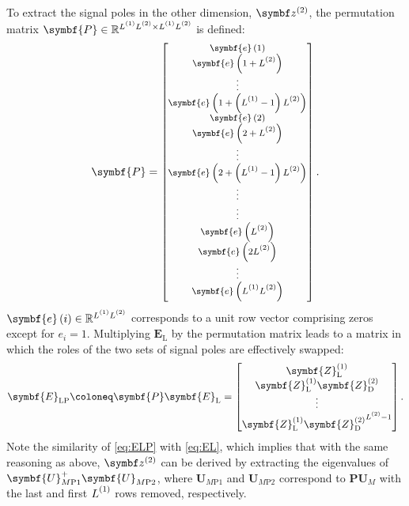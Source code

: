 To extract the signal poles in the other dimension, $\bdztwo$, the permutation
matrix $\symbf{P} \in \mathbb{R}^{\Lone \Ltwo \times \Lone \Ltwo}$ is defined:
\begin{equation}
    \symbf{P} =
    {\footnotesize
    \begin{bmatrix}
        \symbf{e}\left(1\right) \\
        \symbf{e}\left(1 + \Ltwo\right) \\
        \vdots \\
        \symbf{e}\left(1 + \left(\Lone - 1\right)\Ltwo\right) \\
        \symbf{e}\left(2\right) \\
        \symbf{e}\left(2 + \Ltwo\right) \\
        \vdots \\
        \symbf{e}\left(2 + \left(\Lone - 1\right)\Ltwo\right) \\
        \vdots \\
        \vdots \\
        \symbf{e}\left(\Ltwo\right) \\
        \symbf{e}\left(2\Ltwo\right) \\
        \vdots \\
        \symbf{e}\left(\Lone \Ltwo\right) \\
    \end{bmatrix}.
    }
\end{equation}
$\symbf{e}\left(i\right) \in \mathbb{R}^{\Lone \Ltwo}$ corresponds to a unit row
vector comprising zeros except for $e_i = 1$.
Multiplying $\symbf{E}_{\text{L}}$ by the permutation matrix leads to a matrix
in which the roles of the two sets of signal poles are effectively swapped:
\begin{equation}
    \symbf{E}_{\text{LP}} \coloneq \symbf{P} \symbf{E}_{\text{L}} =
    \begin{bmatrix}
        \symbf{Z}^{(1)}_{\text{L}} \\
        \symbf{Z}^{(1)}_{\text{L}} \symbf{Z}^{(2)}_{\text{D}} \\
        \vdots \\
        \symbf{Z}^{(1)}_{\text{L}} {\symbf{Z}^{(2)}_{\text{D}}}^{\Ltwo - 1} \\
    \end{bmatrix}.\label{eq:ELP}
\end{equation}
Note the similarity of \cref{eq:ELP} with \cref{eq:EL}, which
implies that with the same reasoning as above, $\bdztwo$ can be derived
by extracting the eigenvalues of $\symbf{U}_{M\text{P}1}^+
\symbf{U}_{M\text{P}2}^{\vphantom{+}}$, where $\symbf{U}_{M\text{P}1}$ and
$\symbf{U}_{M\text{P}2}$ correspond to $\symbf{P} \symbf{U}_M$
with the last and first $\Lone$ rows removed, respectively.

